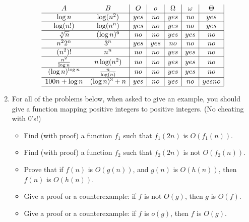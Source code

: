 \documentclass[11pt, solution, letterpaper]{format}
\begin{document}
\begin{enumerate}
$$
\begin{array}{cc|c|c|c|c|c|}
A & B & O & o & \Omega & \omega & \Theta \\ \hline
\log{n} & \log(n^2) & yes & no & yes & no & yes \\ \hline
\log (n!) & \log(n^n) & yes & no & yes & no & yes\\ \hline
\sqrt[3]{n} & (\log n)^{6} & no & no & yes & yes & no\\ \hline
n^22^n & 3^n & yes & yes & no & no & no\\ \hline
(n^2)! & n^n & no & no & yes &yes  & no\\ \hline
{n^2 \over \log{n}} & n \log(n^2) & no & no & yes & yes & no\\ \hline
(\log n)^{\log n} & {n \over \log(n)} & no & no & yes & yes & no\\ \hline
100n + \log n & (\log n)^{3} + n & yes & no & yes & no & yes no\\ \hline
\end{array}
$$




\item 
For all of the problems below, when asked to give an example, you
should give a function mapping positive integers to positive integers.
(No cheating with 0's!)
\begin{itemize}
\item Find (with proof) a function $f_1$ such that $f_1(2n)$ is $O(f_1(n))$.
\item Find (with proof) a function $f_2$ such that $f_2(2n)$ is not $O(f_2(n))$.
\item Prove that if $f(n)$ is $O(g(n))$, and $g(n)$ is $O(h(n))$, then 
$f(n)$ is $O(h(n))$.  
\item Give a proof or a counterexample:  if $f$ is not $O(g)$, then $g$ is $O(f)$.  
\item Give a proof or a counterexample:  if $f$ is $o(g)$, then $f$ is
  $O(g)$.  \end{itemize}
  

\end{enumerate}
\end{document}
